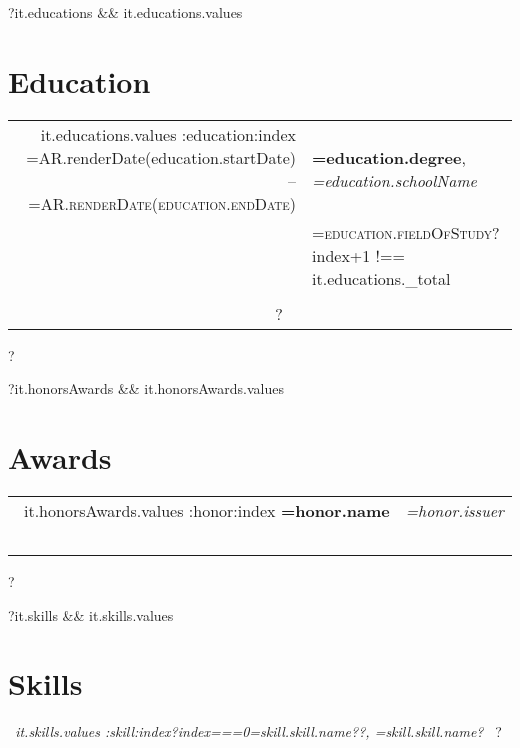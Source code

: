 \documentclass[a4paper,10pt]{article} %
\begin{document}

{{?it.educations && it.educations.values}}
\section{Education}

\begin{tabular}{rl} 

{{~it.educations.values :education:index}}
{{=AR.renderDate(education.startDate)}} -- \textsc{{{=AR.renderDate(education.endDate)}}} & \textbf{{{=education.degree}}}, \textit{{{=education.schoolName}}} \\ 
& \textsc{{{=education.fieldOfStudy}}}{{?index+1 !== it.educations._total}}\\
& \\{{?}}
{{~}}

\end{tabular}
{{?}}


{{?it.honorsAwards && it.honorsAwards.values}}
\section{Awards} 

\begin{tabular}{rl}
{{~it.honorsAwards.values :honor:index}}
\textbf{{{=honor.name}}} & \textit{{{=honor.issuer}}}\\
{{~}}
\end{tabular}
{{?}}



{{?it.skills && it.skills.values}}
\section{Skills} 
\textit{ {{~it.skills.values :skill:index}}{{?index===0}}{{=skill.skill.name}}{{??}}, {{=skill.skill.name}}{{?}}{{~}} }
{{?}}
\end{document}
